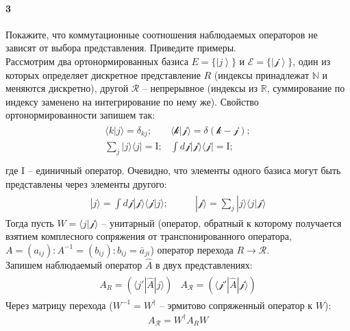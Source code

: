 



\paragraph{3}
Покажите, что коммутационные соотношения наблюдаемых операторов не зависят от выбора представления. Приведите примеры.\\

Рассмотрим два ортонормированных базиса $E=\{\left|j\right\rangle\}$ и $\mathscr{E}=\{\left|\mathscr{j}\right\rangle\}$, один из которых определяет дискретное представление $R$ (индексы принадлежат $\mathbb{N}$ и меняются дискретно), другой $\mathscr{R}$ -- непрерывное (индексы из $\mathbb{R}$, суммирование по индексу заменено на интегрирование по нему же). Свойство ортонормированности запишем так:
\begin{gather*}
    \begin{array}{cc}
        \langle k | j \rangle = \delta_{kj};       & \langle \mathscr{k} | \mathscr{j} \rangle = \delta(\mathscr{k-j});      \\
        \sum_{j}|j\rangle \langle j| = \mathrm{I}; & \int d\mathscr{j} |\mathscr{j}\rangle \langle\mathscr{j}| = \mathrm{I}; \\
    \end{array}
\end{gather*}
где $\mathrm{I}$ -- единичный оператор. Очевидно, что элементы одного базиса могут быть представлены через элементы другого:
\begin{gather*}
    \begin{array}{cc}
        |j\rangle = \int d\mathscr{j} |\mathscr{j}\rangle \langle\mathscr{j}|j\rangle;\qquad &
        |\mathscr{j}\rangle = \sum_{j}|j\rangle \langle j|\mathscr{j}\rangle
    \end{array}
\end{gather*}
Тогда пусть $W=\langle j|\mathscr{j}\rangle$ -- унитарный (оператор, обратный к которому получается взятием комплесного сопряжения от транспонированного оператора, $A=(a_{ij})\colon A^{-1}=(b_{ij})\colon b_{ij}=\bar{a}_{ji}$) оператор перехода $R\rightarrow\mathscr{R}$.\\
Запишем наблюдаемый оператор $\hat{A}$ в двух представлениях:
\begin{gather*}
    \begin{array}{cc}
        A_R = (\langle j'|\hat{A}|j\rangle) & A_\mathscr{R} = (\langle \mathscr{j}'|\hat{A}|\mathscr{j}\rangle)
    \end{array}
\end{gather*}
Через матрицу перехода ($W^{-1}=W^\dagger$ -- эрмитово сопряженный оператор к $W$):
\begin{gather*}
    A_\mathscr{R} = W^\dagger A_R W
\end{gather*}

